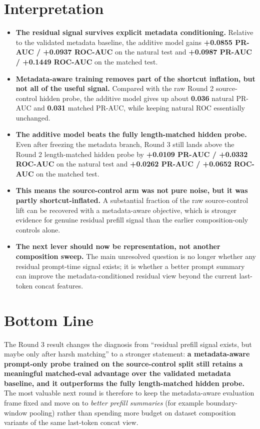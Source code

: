 \documentclass[11pt]{article}
\begin{document}
\section*{Interpretation}
\begin{itemize}
  \item \textbf{The residual signal survives explicit metadata conditioning.} Relative to the validated metadata baseline, the additive model gains \textbf{+0.0855 PR-AUC / +0.0937 ROC-AUC} on the natural test and \textbf{+0.0987 PR-AUC / +0.1449 ROC-AUC} on the matched test.
  \item \textbf{Metadata-aware training removes part of the shortcut inflation, but not all of the useful signal.} Compared with the raw Round 2 source-control hidden probe, the additive model gives up about \textbf{0.036} natural PR-AUC and \textbf{0.031} matched PR-AUC, while keeping natural ROC essentially unchanged.
  \item \textbf{The additive model beats the fully length-matched hidden probe.} Even after freezing the metadata branch, Round 3 still lands above the Round 2 length-matched hidden probe by \textbf{+0.0109 PR-AUC / +0.0332 ROC-AUC} on the natural test and \textbf{+0.0262 PR-AUC / +0.0652 ROC-AUC} on the matched test.
  \item \textbf{This means the source-control arm was not pure noise, but it was partly shortcut-inflated.} A substantial fraction of the raw source-control lift can be recovered with a metadata-aware objective, which is stronger evidence for genuine residual prefill signal than the earlier composition-only controls alone.
  \item \textbf{The next lever should now be representation, not another composition sweep.} The main unresolved question is no longer whether any residual prompt-time signal exists; it is whether a better prompt summary can improve the metadata-conditioned residual view beyond the current last-token concat features.
\end{itemize}

\section*{Bottom Line}
The Round 3 result changes the diagnosis from ``residual prefill signal exists, but maybe only after harsh matching'' to a stronger statement: \textbf{a metadata-aware prompt-only probe trained on the source-control split still retains a meaningful matched-eval advantage over the validated metadata baseline, and it outperforms the fully length-matched hidden probe.} The most valuable next round is therefore to keep the metadata-aware evaluation frame fixed and move on to \emph{better prefill summaries} (for example boundary-window pooling) rather than spending more budget on dataset composition variants of the same last-token concat view.
\end{document}
